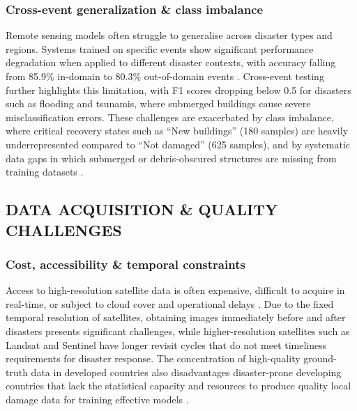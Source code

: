 \documentclass[conference,a4paper]{IEEEtran}
\begin{document}
\subsubsection{\textbf{Cross-event generalization \& class imbalance}}
Remote sensing models often struggle to generalise across disaster types and regions. Systems trained on specific events show significant performance degradation when applied to different disaster contexts, with accuracy falling from 85.9\% in-domain to 80.3\% out-of-domain events \cite{kimDisasterAssessmentUsing2022}. Cross-event testing further highlights this limitation, with F1 scores dropping below 0.5 for disasters such as flooding and tsunamis, where submerged buildings cause severe misclassification errors. These challenges are exacerbated by class imbalance, where critical recovery states such as ``New buildings'' (180 samples) are heavily underrepresented compared to ``Not damaged'' (625 samples), and by systematic data gaps in which submerged or debris-obscured structures are missing from training datasets \cite{lagapEnhancingPostDisasterDamage2025}.


\subsection{DATA ACQUISITION \& QUALITY CHALLENGES}

\subsubsection{\textbf{Cost, accessibility \& temporal constraints}}
Access to high-resolution satellite data is often expensive, difficult to acquire in real-time, or subject to cloud cover and operational delays \cite{lagapEnhancingPostDisasterDamage2025}. Due to the fixed temporal resolution of satellites, obtaining images immediately before and after disasters presents significant challenges, while higher-resolution satellites such as Landsat and Sentinel have longer revisit cycles that do not meet timeliness requirements for disaster response. The concentration of high-quality ground-truth data in developed countries also disadvantages disaster-prone developing countries that lack the statistical capacity and resources to produce quality local damage data for training effective models \cite{kimDisasterAssessmentUsing2022}.
\end{document}
